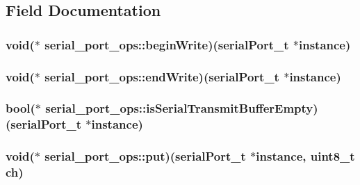 \subsection{Field Documentation}
\hypertarget{structserial__port__ops_aa90d516e11def22b513dcac0fb86746d}{
\subsubsection[{begin\+Write}]{\setlength{\rightskip}{0pt plus 5cm}void($\ast$ serial\+\_\+port\+\_\+ops\+::begin\+Write)({\bf serial\+Port\+\_\+t} $\ast$instance)}}\label{structserial__port__ops_aa90d516e11def22b513dcac0fb86746d}
\hypertarget{structserial__port__ops_a0da4d2c209d8ec5b95005f5573d89385}{
\subsubsection[{end\+Write}]{\setlength{\rightskip}{0pt plus 5cm}void($\ast$ serial\+\_\+port\+\_\+ops\+::end\+Write)({\bf serial\+Port\+\_\+t} $\ast$instance)}}\label{structserial__port__ops_a0da4d2c209d8ec5b95005f5573d89385}
\hypertarget{structserial__port__ops_a006fe583d610a68d0d8e74d142dd396e}{
\subsubsection[{is\+Serial\+Transmit\+Buffer\+Empty}]{\setlength{\rightskip}{0pt plus 5cm}bool($\ast$ serial\+\_\+port\+\_\+ops\+::is\+Serial\+Transmit\+Buffer\+Empty)({\bf serial\+Port\+\_\+t} $\ast$instance)}}\label{structserial__port__ops_a006fe583d610a68d0d8e74d142dd396e}
\hypertarget{structserial__port__ops_afc535b2947ced3170a79a4f5883833dc}{
\subsubsection[{put}]{\setlength{\rightskip}{0pt plus 5cm}void($\ast$ serial\+\_\+port\+\_\+ops\+::put)({\bf serial\+Port\+\_\+t} $\ast$instance, uint8\+\_\+t ch)}}\label{structserial__port__ops_afc535b2947ced3170a79a4f5883833dc}
